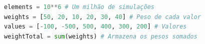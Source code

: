 \begin{lstlisting}[language=Python]
elements = 10**6 # Um milhão de simulações
weights = [50, 20, 10, 20, 30, 40] # Peso de cada valor
values = [-100, -500, 500, 400, 300, 200] # Valores
weightTotal = sum(weights) # Armazena os pesos somados
\end{lstlisting}
